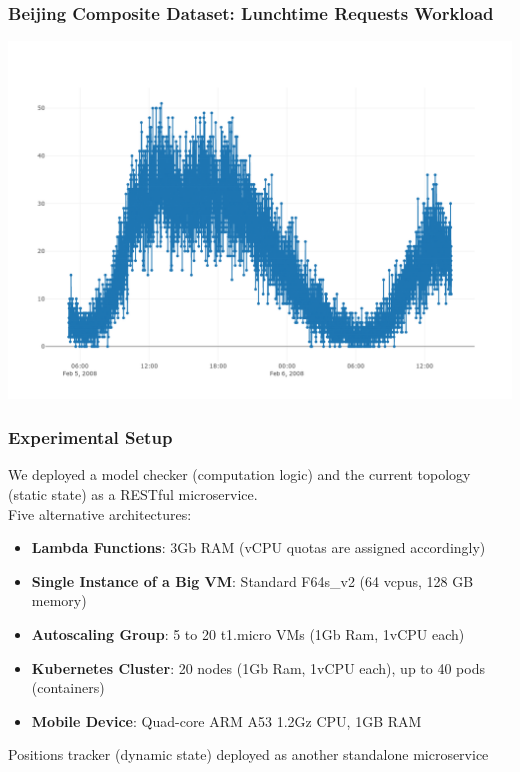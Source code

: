 \documentclass[pdf,10pt]{beamer}
\begin{document}
\begin{frame}\frametitle{Beijing Composite Dataset: Lunchtime Requests Workload}
\begin{center}
  \includegraphics[width=1\textwidth]{img/20sec-feb5.png}
\end{center}
\end{frame}




\begin{frame}\frametitle{Experimental Setup}

We deployed a model checker (computation logic) and the current topology (static state) as a RESTful microservice. \\
Five alternative architectures:
\begin{itemize}
	
\item \textbf{Lambda Functions}: 3Gb RAM (vCPU quotas are assigned accordingly)
\item \textbf{Single Instance  of a Big VM}: Standard F64s\_v2 (64 vcpus, 128 GB memory)
\item \textbf{Autoscaling Group}: 5 to 20 t1.micro VMs (1Gb Ram, 1vCPU each)
\item \textbf{Kubernetes Cluster}: 20 nodes (1Gb Ram, 1vCPU each), up to 40 pods (containers)
\item \textbf{Mobile Device}: Quad-core ARM A53 1.2Gz CPU, 1GB RAM
\end{itemize}
Positions tracker (dynamic state) deployed as another standalone microservice

\end{frame}
\end{document}
